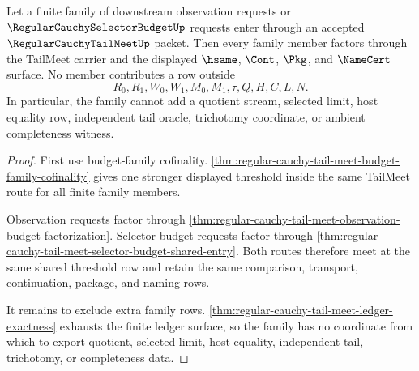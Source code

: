 \begin{theorem}
\label{thm:regular-cauchy-tail-meet-budget-family-row-exhaustion}
Let a finite family of downstream observation requests or $\RegularCauchySelectorBudgetUp$ requests enter through an accepted $\RegularCauchyTailMeetUp$ packet. Then every family member factors through the TailMeet carrier and the displayed $\hsame$, $\Cont$, $\Pkg$, and $\NameCert$ surface. No member contributes a row outside
$$
R_0,R_1,W_0,W_1,M_0,M_1,\tau,Q,H,C,L,N.
$$
In particular, the family cannot add a quotient stream, selected limit, host equality row, independent tail oracle, trichotomy coordinate, or ambient completeness witness.
\end{theorem}
\begin{proof}
First use budget-family cofinality. \autoref{thm:regular-cauchy-tail-meet-budget-family-cofinality} gives one stronger displayed threshold inside the same TailMeet route for all finite family members.

Observation requests factor through \autoref{thm:regular-cauchy-tail-meet-observation-budget-factorization}. Selector-budget requests factor through \autoref{thm:regular-cauchy-tail-meet-selector-budget-shared-entry}. Both routes therefore meet at the same shared threshold row and retain the same comparison, transport, continuation, package, and naming rows.

It remains to exclude extra family rows. \autoref{thm:regular-cauchy-tail-meet-ledger-exactness} exhausts the finite ledger surface, so the family has no coordinate from which to export quotient, selected-limit, host-equality, independent-tail, trichotomy, or completeness data.
\end{proof}

